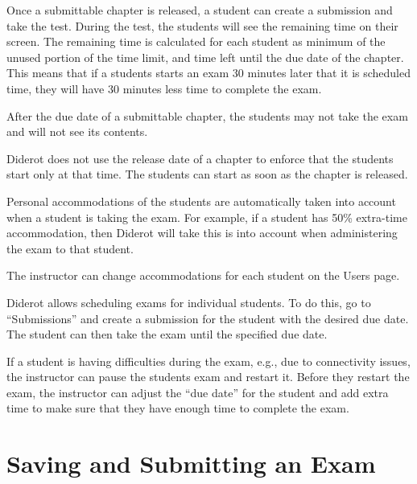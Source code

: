 \begin{gram}
Once a submittable chapter is released, a student can create a submission and take the test.  During the test, the students will see the remaining time on their screen.  The remaining time is calculated for each student as minimum of the unused portion of the time limit, and time left until the due date of the chapter.  This means that if a students starts an exam 30 minutes later that it is scheduled time, they will have 30 minutes less time to complete the exam.

After the due date of a submittable chapter, the students may not take the exam and will not see its contents.

Diderot does not use the release date of a chapter to enforce that the students start only at that time.  The students can start as soon as the chapter is released.
\end{gram}


\begin{gram}[Accommodations]
Personal accommodations of the students are automatically taken into account when a student is taking the exam.  For example, if a student has 50\% extra-time accommodation, then Diderot will take this is into account when administering the exam to that student.  

The instructor can change accommodations for each student on the Users page. 
\end{gram}

\begin{gram}
Diderot allows scheduling exams for individual students.  To do this, go to ``Submissions'' and create a submission for the student with the desired due date.  The student can then take the exam until the specified due date.
\end{gram}


\begin{gram}

If a student is having difficulties during the exam, e.g., due to connectivity issues, the instructor can pause the students exam and restart it.  Before they restart the exam, the instructor can adjust the ``due date'' for the student and add extra time to make sure that they have enough time to complete the exam. 

\end{gram}

\section{Saving and Submitting an Exam}
\label{ch:quiz::submit}

